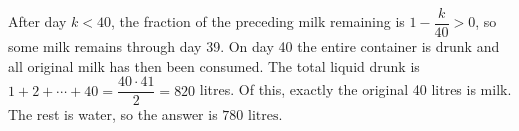After day $k<40$, the fraction of the preceding milk remaining is $1-\dfrac{k}{40}>0$, so some milk remains through day 39. On day 40 the entire container is drunk and all original milk has then been consumed. The total liquid drunk is $1+2+\cdots+40=\dfrac{40\cdot41}{2}=820$ litres. Of this, exactly the original 40 litres is milk. The rest is water, so the answer is $\boxed{780\text{ litres}}$.
